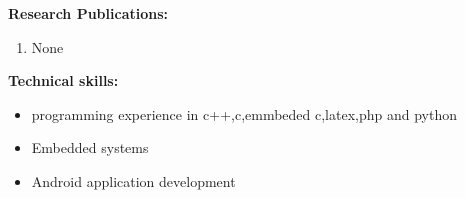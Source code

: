 \documentclass[10pt,a4paper]{article}
\begin{document}
\begin{flushleft}
	\textbf{Research Publications:}
	\begin{enumerate}
		\item None\\ \medskip
	\end{enumerate} 
	\textbf{Technical skills:}\\
	\begin{itemize}
		\item programming experience in c++,c,emmbeded c,latex,php and python\\
		\item  Embedded systems\\
		\item  Android application development\\
	\end{itemize}
	
\end{flushleft}

 
\end{document}
